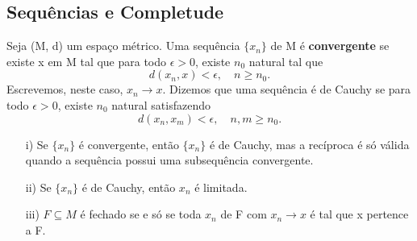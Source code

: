 \documentclass[ComplexAnalysis/complex.tex]{subfiles}
\begin{document}
\subsection{Sequências e Completude}
\begin{def*}
	Seja (M, d) um espaço métrico. Uma sequência $\{x _{n}\}$ de M é \textbf{convergente} se existe x em M tal que
	para todo $\epsilon > 0$, existe $n_{0}$ natural tal que
	$$
		d(x _{n}, x) < \epsilon, \quad n\geq n_{0}.
	$$
	Escrevemos, neste caso, $x _{n}\to x$. Dizemos que uma sequência é de Cauchy se para todo $\epsilon > 0$, existe
	$n_{0}$ natural satisfazendo
	$$
		d(x _{n}, x _{m}) < \epsilon, \quad n, m \geq n_{0}.
	$$
\end{def*}

\begin{exer*}
	\begin{itemize}
		\item[i)] Se $\{x _{n}\}$ é convergente, então $\{x_n\}$ é de Cauchy, mas a recíproca é só válida
		      quando a sequência possui uma subsequência convergente.
		\item[ii)] Se $\{x_{n}\}$ é de Cauchy, então $x_{n}$ é limitada.
		\item[iii)] $F\subseteq{M}$ é fechado se e só se toda $x_{n}$ de F com $x_{n}\to x$ é tal que x pertence a F.
	\end{itemize}
\end{exer*}
\end{document}
